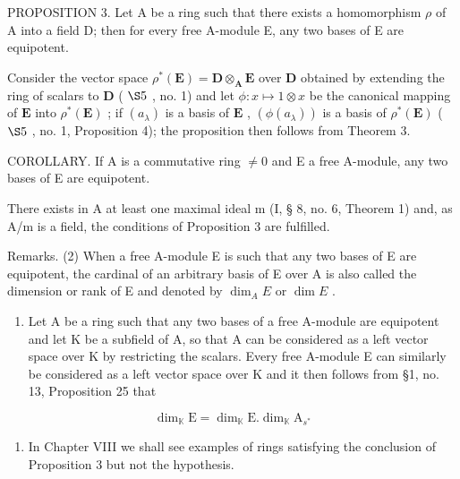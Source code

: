PROPOSITION 3. Let A be a ring such that there exists a homomorphism \(\rho\) of A into a field D; then for every free A-module E, any two bases of E are equipotent.

Consider the vector space \(\rho^{*}(\mathbf{E}) = \mathbf{D} \otimes_{\mathbf{A}} \mathbf{E}\) over \(\mathbf{D}\) obtained by extending the ring of scalars to \(\mathbf{D}\) ( \(\S 5\) , no. 1) and let \(\phi: x \mapsto 1 \otimes x\) be the canonical mapping of \(\mathbf{E}\) into \(\rho^{*}(\mathbf{E})\) ; if \((a_{\lambda})\) is a basis of \(\mathbf{E}\) , \((\phi(a_{\lambda}))\) is a basis of \(\rho^{*}(\mathbf{E})\) ( \(\S 5\) , no. 1, Proposition 4); the proposition then follows from Theorem 3.

COROLLARY. If A is a commutative ring \(\neq0\) and E a free A-module, any two bases of E are equipotent.

There exists in A at least one maximal ideal m (I, § 8, no. 6, Theorem 1) and, as A/m is a field, the conditions of Proposition 3 are fulfilled.

Remarks. (2) When a free A-module E is such that any two bases of E are equipotent, the cardinal of an arbitrary basis of E over A is also called the dimension or rank of E and denoted by \(\dim_{A}E\) or \(\dim E\) .

\begin{enumerate}
\def\labelenumi{(\arabic{enumi})}
\setcounter{enumi}{2}
\tightlist
\item
  Let A be a ring such that any two bases of a free A-module are equipotent and let K be a subfield of A, so that A can be considered as a left vector space over K by restricting the scalars. Every free A-module E can similarly be considered as a left vector space over K and it then follows from §1, no. 13, Proposition 25 that
\end{enumerate}

\[
\dim_ {\mathbb {K}} \mathrm{E} = \dim_ {\mathbb {K}} \mathrm{E}. \dim_ {\mathbb {K}} \mathrm{A} _ {s ^ {*}}\tag{2}
\]

\begin{enumerate}
\def\labelenumi{(\arabic{enumi})}
\setcounter{enumi}{3}
\tightlist
\item
  In Chapter VIII we shall see examples of rings satisfying the conclusion of Proposition 3 but not the hypothesis.
\end{enumerate}
\relax{}
